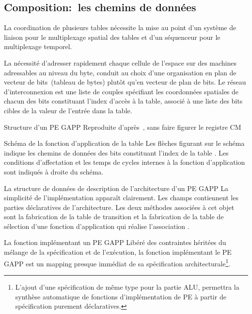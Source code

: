 \subsection{Composition:~les chemins de données}

%
La coordination de plusieurs tables nécessite la mise au point d'un
système de liaison  pour le multiplexage spatial
des tables et d'un séquenceur pour le multiplexage temporel. %

La nécessité d'adresser rapidement chaque cellule de l'espace sur des
machines adressables au niveau du byte, conduit au choix d'une
organisation en plan de vecteur de bits~(tableau de bytes) plutôt
qu'en vecteur de plan de bits. %
Le réseau d'interconnexion est une liste de couples
 spécifiant les coordonnées spatiales de chacun
des bits constituant l'index d'accès à la table, associé à une liste
des bits cibles de la valeur de l'entrée dans la table. %

%
{}%
{Structure d'un PE GAPP}%
{Reproduite d'après~\cite{NCR85a}, sans faire figurer le registre CM}%

%
{}%
{Schéma de la fonction d'application de la table }
{Les flèches figurant sur le schéma indique les chemins de données des
  bits constituant l'index de la table . %
  Les conditions d'affectation et les temps de cycles internes à la
  fonction d'application sont indiqués à droite du schéma.}

%
{}%
{La structure de données de description de l'architecture d'un PE GAPP}%
{La simplicité de l'implémentation apparaît clairement. %
  Les champs  contiennent les parties déclaratives de
  l'architecture. %
  Les deux méthodes associées à cet objet sont la fabrication de la
  table de transition et la fabrication de la table de sélection d'une
  fonction d'application qui réalise l'association
  .}

%
{}%
{La fonction implémentant un PE GAPP}%
{Libéré des contraintes héritées du mélange de la spécification et de
  l'exécution, la fonction implémentant le PE GAPP est un mapping
  presque immédiat de sa spécification architecturale\footnote{%
    L'ajout d'une spécification de même type pour la partie ALU,
    permettra la synthèse automatique de fonctions d'implémentation de
    PE à partir de spécification purement déclaratives.}.}

